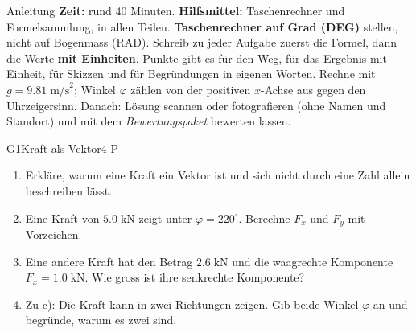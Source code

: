 \documentclass[11pt]{article}
\begin{document}

\begin{lpinfo}{Anleitung}
\textbf{Zeit:} rund 40 Minuten. \textbf{Hilfsmittel:} Taschenrechner und Formelsammlung, in allen Teilen.
\textbf{Taschenrechner auf Grad (DEG)} stellen, nicht auf Bogenmass (RAD).
Schreib zu jeder Aufgabe zuerst die Formel, dann die Werte \textbf{mit Einheiten}. Punkte gibt es für den Weg,
für das Ergebnis mit Einheit, für Skizzen und für Begründungen in eigenen Worten. Rechne mit $g = 9.81\;\text{m/s}^2$;
Winkel \(\varphi\) zählen von der positiven \(x\)-Achse aus gegen den Uhrzeigersinn.
Danach: Lösung scannen oder fotografieren (ohne Namen und Standort) und mit dem \emph{Bewertungspaket} bewerten lassen.
\end{lpinfo}


\begin{lpaufgabe}{G1}{Kraft als Vektor}{4 P}
\begin{enumerate}[label=\alph*),leftmargin=*,itemsep=2pt,topsep=2pt]
\item Erkläre, warum eine Kraft ein Vektor ist und sich nicht durch eine Zahl allein beschreiben lässt.
\item Eine Kraft von \(5.0\;\text{kN}\) zeigt unter \(\varphi = 220^\circ\). Berechne \(F_x\) und \(F_y\) mit Vorzeichen.
\item Eine andere Kraft hat den Betrag \(2.6\;\text{kN}\) und die waagrechte Komponente \(F_x = 1.0\;\text{kN}\). Wie gross ist ihre senkrechte Komponente?
\item Zu c): Die Kraft kann in zwei Richtungen zeigen. Gib beide Winkel \(\varphi\) an und begründe, warum es zwei sind.
\end{enumerate}
\end{lpaufgabe}
\end{document}
